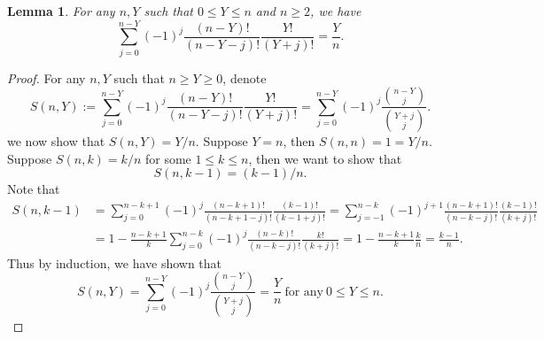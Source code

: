 \documentclass[12pt,letterpaper]{article}
\newtheorem{lemma}{Lemma}[section]
\begin{document}
\begin{lemma}\label{lemma:combinatorics}
For any $n,Y$ such that $0\leq Y\leq n$ and $n\geq2$, we have  
$$\sum_{j=0}^{n-Y}(-1)^j\frac{(n-Y)!}{(n-Y-j)!}\frac{Y!}{(Y+j)!}=\frac{Y}{n}.$$
\end{lemma}
\begin{proof}
For any $n,Y$ such that $n\geq Y\geq0$, denote
$$S(n,Y):=\sum_{j=0}^{n-Y}(-1)^j\frac{(n-Y)!}{(n-Y-j)!}\frac{Y!}{(Y+j)!}=\sum_{j=0}^{n-Y}(-1)^j\frac{{n-Y\choose j}}{{Y+j\choose j}}.$$
we now show that $S(n,Y)=Y/n$. Suppose $Y=n$, then $S(n,n)=1=Y/n$. Suppose $S(n,k)=k/n$ for some $1\leq k\leq n$, then we want to show that $$S(n,k-1)=(k-1)/n.$$ 
Note that 
\begin{equation}\label{eq:S(n,n-Y)}
\begin{array}{rl}
S(n,k-1)\!\!\!\!\!\!&\displaystyle=\sum_{j=0}^{n-k+1}(-1)^j\frac{(n-k+1)!}{(n-k+1-j)!}\frac{(k-1)!}{(k-1+j)!}=\sum_{j=-1}^{n-k}(-1)^{j+1}\frac{(n-k+1)!}{(n-k-j)!}\frac{(k-1)!}{(k+j)!}\\
&\displaystyle=1-\frac{n-k+1}{k}\sum_{j=0}^{n-k}(-1)^j\frac{(n-k)!}{(n-k-j)!}\frac{k!}{(k+j)!}=1-\frac{n-k+1}{k}\frac{k}{n}=\frac{k-1}{n}.
\end{array}
\end{equation}
Thus by induction, we have shown that 
\begin{equation}\label{eq:S(n,Y)}
    S(n,Y)=\sum_{j=0}^{n-Y}(-1)^j\frac{{n-Y\choose j}}{{Y+j\choose j}}=\frac{Y}{n}\ \mbox{for any}\ 0\leq Y\leq n.
\end{equation}
\end{proof}
\end{document}
